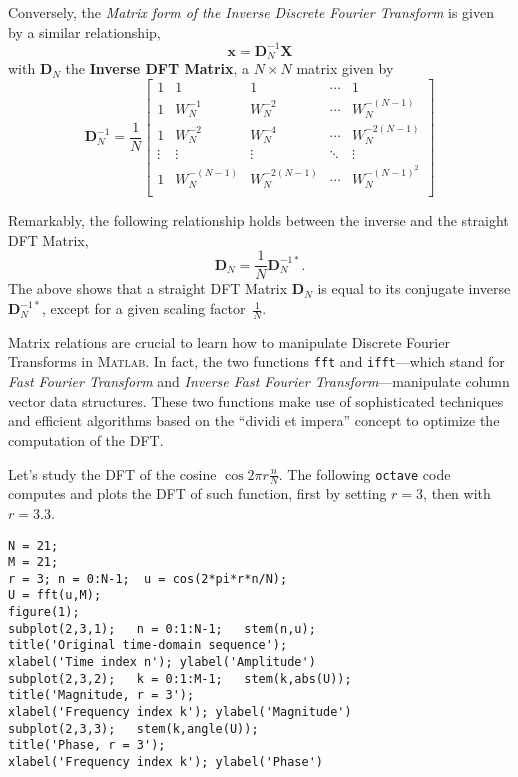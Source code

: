 \documentclass[\documentfontsize, twocolumn]{\classname}
\begin{document}
Conversely, the \emph{Matrix form of the Inverse Discrete Fourier Transform} is given by a similar relationship,
\begin{equation}\label{eqn:idftMatrixForm}
    \bm{x} = \bm{D}^{-1}_N\bm{X}
\end{equation}
with $\bm D_N$ the \textbf{Inverse DFT Matrix}, a $N \times N$ matrix given by
\begin{equation}\label{eqn:idftMatrixDn}
    \bm D^{-1}_N = \frac 1 N\begin{bmatrix}
        1 & 1 & 1 & \cdots & 1 \\
        1 & W_N^{-1} & W_N^{-2} & \cdots & W_N^{-(N-1)} \\
        1 & W_N^{-2} & W_N^{-4} & \cdots & W_N^{-2(N-1)} \\
        \vdots & \vdots & \vdots & \ddots & \vdots \\
        1 & W_N^{-(N-1)} & W_N^{-2(N-1)} & \cdots & W_N^{-(N-1)^2} \\
    \end{bmatrix}
\end{equation}

Remarkably, the following relationship holds between the inverse and the straight DFT Matrix,
\[
    \bm D_N = \frac 1 N \bm D^{-1*}_N.
\]
The above shows that a straight DFT Matrix $\bm D_N$ is equal to its conjugate inverse $\bm D^{-1*}_N$, except for a given scaling factor~$\frac 1 N$.

Matrix relations are crucial to learn how to manipulate Discrete Fourier Transforms in \textsc{Matlab}. In fact, the two functions \texttt{fft} and \texttt{ifft}---which stand for \emph{Fast Fourier Transform} and \emph{Inverse Fast Fourier Transform}---manipulate column vector data structures. These two functions make use of sophisticated techniques and efficient algorithms based on the ``dividi et impera'' concept to optimize the computation of the DFT.

Let's study the DFT of the cosine $\cos{2\pi r \frac{n}{N}}$. The following \texttt{octave} code computes and plots the DFT of such function, first by setting $r=3$, then with $r=3.3$.
\begin{verbatim}
N = 21;
M = 21;
r = 3; n = 0:N-1;  u = cos(2*pi*r*n/N);
U = fft(u,M);
figure(1);
subplot(2,3,1);   n = 0:1:N-1;   stem(n,u);
title('Original time-domain sequence');
xlabel('Time index n'); ylabel('Amplitude')
subplot(2,3,2);   k = 0:1:M-1;   stem(k,abs(U));
title('Magnitude, r = 3');
xlabel('Frequency index k'); ylabel('Magnitude')
subplot(2,3,3);   stem(k,angle(U));
title('Phase, r = 3');
xlabel('Frequency index k'); ylabel('Phase')
\end{verbatim}
\end{document}
